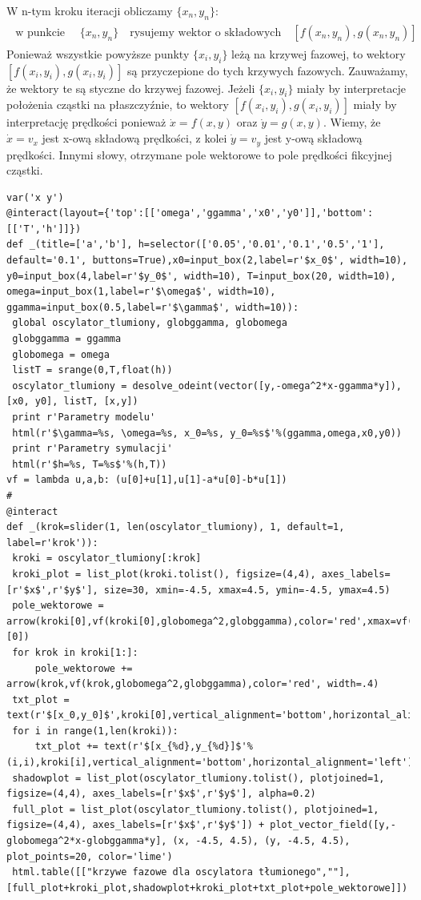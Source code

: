 \documentclass[a4paper,12pt,polish]{sphinxmanual}
\begin{document}
W n-tym kroku iteracji obliczamy  $\{x_n, y_n\}$:
\label{ch1/chI021:equation-eqn67}\begin{gather}
\begin{split}\mbox{w punkcie }  \quad \{x_n, y_n\}   \quad \mbox{rysujemy wektor o składowych} \quad [f(x_n, y_n), g(x_n, y_n)]\end{split}\label{ch1/chI021-eqn67}
\end{gather}
Ponieważ wszystkie powyższe punkty  $\{x_i, y_i\}$ leżą na krzywej fazowej, to wektory $[f(x_i, y_i), g(x_i, y_i)]$  są przyczepione do tych krzywych fazowych. Zauważamy, że wektory te są styczne do krzywej fazowej. Jeżeli $\{x_i, y_i\}$ miały by interpretacje położenia cząstki na płaszczyźnie, to wektory  $[f(x_i, y_i), g(x_i, y_i)]$ miały by interpretację prędkości ponieważ $\dot x = f(x, y)$ oraz $\dot y = g(x, y)$. Wiemy, że $\dot x = v_x$ jest x-ową składową prędkości, z kolei $\dot y = v_y$ jest y-ową składową prędkości. Innymi słowy, otrzymane pole wektorowe to pole prędkości fikcyjnej cząstki.


\begin{verbatim}
var('x y')
@interact(layout={'top':[['omega','ggamma','x0','y0']],'bottom':[['T','h']]})
def _(title=['a','b'], h=selector(['0.05','0.01','0.1','0.5','1'], default='0.1', buttons=True),x0=input_box(2,label=r'$x_0$', width=10), y0=input_box(4,label=r'$y_0$', width=10), T=input_box(20, width=10), omega=input_box(1,label=r'$\omega$', width=10), ggamma=input_box(0.5,label=r'$\gamma$', width=10)):
 global oscylator_tlumiony, globggamma, globomega
 globggamma = ggamma
 globomega = omega
 listT = srange(0,T,float(h))
 oscylator_tlumiony = desolve_odeint(vector([y,-omega^2*x-ggamma*y]), [x0, y0], listT, [x,y])
 print r'Parametry modelu'
 html(r'$\gamma=%s, \omega=%s, x_0=%s, y_0=%s$'%(ggamma,omega,x0,y0))
 print r'Parametry symulacji'
 html(r'$h=%s, T=%s$'%(h,T))
vf = lambda u,a,b: (u[0]+u[1],u[1]-a*u[0]-b*u[1])
#
@interact
def _(krok=slider(1, len(oscylator_tlumiony), 1, default=1, label=r'krok')):
 kroki = oscylator_tlumiony[:krok]
 kroki_plot = list_plot(kroki.tolist(), figsize=(4,4), axes_labels=[r'$x$',r'$y$'], size=30, xmin=-4.5, xmax=4.5, ymin=-4.5, ymax=4.5)
 pole_wektorowe = arrow(kroki[0],vf(kroki[0],globomega^2,globggamma),color='red',xmax=vf(kroki[0],globomega^2,globggamma)[0])
 for krok in kroki[1:]:
     pole_wektorowe += arrow(krok,vf(krok,globomega^2,globggamma),color='red', width=.4)
 txt_plot = text(r'$[x_0,y_0]$',kroki[0],vertical_alignment='bottom',horizontal_alignment='left')
 for i in range(1,len(kroki)):
     txt_plot += text(r'$[x_{%d},y_{%d}]$'%(i,i),kroki[i],vertical_alignment='bottom',horizontal_alignment='left')
 shadowplot = list_plot(oscylator_tlumiony.tolist(), plotjoined=1, figsize=(4,4), axes_labels=[r'$x$',r'$y$'], alpha=0.2)
 full_plot = list_plot(oscylator_tlumiony.tolist(), plotjoined=1, figsize=(4,4), axes_labels=[r'$x$',r'$y$']) + plot_vector_field([y,-globomega^2*x-globggamma*y], (x, -4.5, 4.5), (y, -4.5, 4.5), plot_points=20, color='lime')
 html.table([["krzywe fazowe dla oscylatora tłumionego",""],[full_plot+kroki_plot,shadowplot+kroki_plot+txt_plot+pole_wektorowe]])
\end{verbatim}
\end{document}
